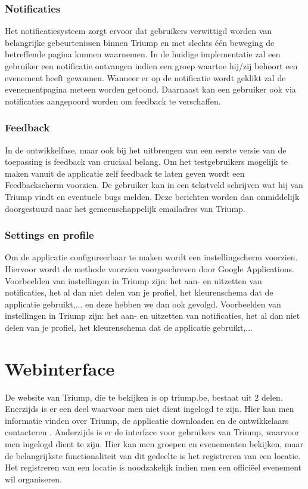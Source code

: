 \subsubsection{Notificaties}%
Het notificatiesysteem zorgt ervoor dat gebruikers verwittigd worden van belangrijke gebeurtenissen binnen Triump en met slechts één beweging de betreffende pagina kunnen waarnemen. In de huidige implementatie zal een gebruiker een notificatie ontvangen indien een groep waartoe hij/zij behoort een evenement heeft gewonnen. Wanneer er op de notificatie wordt geklikt zal de evenementpagina meteen worden getoond. Daarnaast kan een gebruiker ook via notificaties aangepoord worden om feedback te verschaffen.   


\subsubsection{Feedback}%
In de ontwikkelfase, maar ook bij het uitbrengen van een eerste versie van de toepassing is feedback van cruciaal belang. Om het testgebruikers mogelijk te maken vanuit de applicatie zelf feedback te laten geven wordt een Feedbackscherm voorzien. De gebruiker kan in een tekstveld schrijven wat hij van Triump vindt en eventuele bugs melden. Deze berichten worden dan onmiddelijk doorgestuurd naar het gemeenschappelijk emailadres van Triump.
\subsubsection{Settings en profile}%
Om de applicatie configureerbaar te maken wordt een instellingscherm voorzien. Hiervoor wordt de methode voorzien voorgeschreven door Google Applications.
Voorbeelden van instellingen in Triump zijn: het aan- en uitzetten van notificaties, het al dan niet delen van je profiel, het kleurenschema dat de applicatie gebruikt,...
en deze hebben we dan ook gevolgd. Voorbeelden van instellingen in Triump zijn: het aan- en uitzetten van notificaties, het al dan niet delen van je profiel, het kleurenschema dat de applicatie gebruikt,...



\section{Webinterface}%
De website van Triump, die te bekijken is op triump.be, bestaat uit 2 delen. Enerzijds is er een deel waarvoor men niet dient ingelogd te zijn. Hier kan men informatie vinden over Triump, de applicatie downloaden en de ontwikkelaars contacteren . Anderzijds is er de interface voor gebruikers van Triump, waarvoor men ingelogd dient te zijn. Hier kan men groepen en evenementen bekijken, maar de belangrijkste functionaliteit van dit gedeelte is het registreren van een locatie.
Het registreren van een locatie is noodzakelijk indien men een officiëel evenement wil organiseren.
